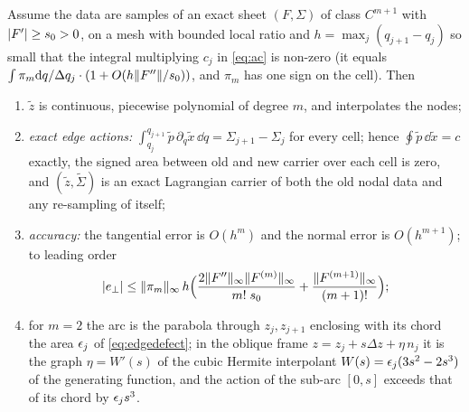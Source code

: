 \begin{theorem}\label{thm:ac}
Assume the data are samples of an exact sheet $(F,\Sigma)$ of class $C^{m+1}$ with $\lvert F'\rvert\ge s_0>0$, on a mesh
with bounded local ratio and $h=\max_j(q_{j+1}-q_j)$ so small that the integral multiplying $c_j$ in \eqref{eq:ac} is
non-zero (it equals $\int\pi_m\mathrm{d} q/\Delta q_j\cdot(1+O(h\lVert F''\rVert/s_0))$, and $\pi_m$ has one sign on the cell). Then
\begin{enumerate}[label=(\roman*),leftmargin=2.2em,itemsep=1pt]
\item $\tilde z$ is continuous, piecewise polynomial of degree $m$, and interpolates the nodes;
\item \emph{exact edge actions:} $\int_{q_j}^{q_{j+1}}\tilde p\,\partial_q\tilde x\,\dd q=\Sigma_{j+1}-\Sigma_j$ for every
cell; hence $\oint\tilde p\,\dd\tilde x=c$ exactly, the signed area between old and new carrier over each cell is
zero, and $(\tilde z,\tilde\Sigma)$ is an exact Lagrangian carrier of both the old nodal data and any re-sampling of itself;
\item \emph{accuracy:} the tangential error is $O(h^m)$ and the normal error is $O(h^{m+1})$; to leading order
\begin{equation}\label{eq:acerr}
\lvert e_\perp\rvert\le\lVert \pi_m\rVert_\infty\,h\Big(\frac{2\lVert F''\rVert_\infty\lVert F^{(m)}\rVert_\infty}{m!\;s_0}+\frac{\lVert F^{(m+1)}\rVert_\infty}{(m+1)!}\Big);
\end{equation}
\item for $m=2$ the arc is the parabola through $z_j,z_{j+1}$ enclosing with its chord the area
$\epsilon_j$ of \eqref{eq:edgedefect}; in the oblique frame $z=z_j+s\Delta z+\eta\,n_j$ it is the graph $\eta=W'(s)$
of the cubic Hermite interpolant $W(s)=\epsilon_j(3s^2-2s^3)$ of the generating function, and the action of the
sub-arc $[0,s]$ exceeds that of its chord by $\epsilon_js^3$.
\end{enumerate}
\end{theorem}

